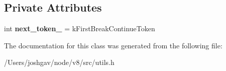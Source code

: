 \subsection*{Private Attributes}
\begin{DoxyCompactItemize}
\item 
int {\bfseries next\+\_\+token\+\_\+} = k\+First\+Break\+Continue\+Token\hypertarget{classv8_1_1internal_1_1_token_dispenser_for_finally_ac7e45be1848b2417fe0fc62fddbea743}{}\label{classv8_1_1internal_1_1_token_dispenser_for_finally_ac7e45be1848b2417fe0fc62fddbea743}

\end{DoxyCompactItemize}


The documentation for this class was generated from the following file\+:\begin{DoxyCompactItemize}
\item 
/\+Users/joshgav/node/v8/src/utils.\+h\end{DoxyCompactItemize}
